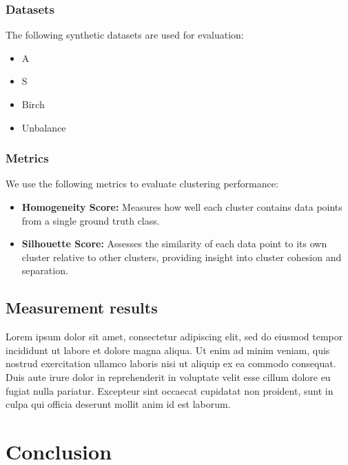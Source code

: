 \documentclass[10pt,twocolumn,letterpaper]{article}
\begin{document}
\subsubsection{Datasets}

The following synthetic datasets are used for evaluation:
\begin{itemize}
    \item A
    \item S
    \item Birch
    \item Unbalance
\end{itemize}

\subsubsection{Metrics}

We use the following metrics to evaluate clustering performance:
\begin{itemize}
    \item \textbf{Homogeneity Score:} Measures how well each cluster contains data points from a single ground truth class.
    \item \textbf{Silhouette Score:} Assesses the similarity of each data point to its own cluster relative to other clusters, providing insight into cluster cohesion and separation.
\end{itemize}


\subsection{Measurement results}\label{subsec:measurement-results}

Lorem ipsum dolor sit amet, consectetur adipiscing elit, sed do eiusmod tempor
incididunt ut labore et dolore magna aliqua. Ut enim ad minim veniam, quis
nostrud exercitation ullamco laboris nisi ut aliquip ex ea commodo consequat.
Duis aute irure dolor in reprehenderit in voluptate velit esse cillum dolore eu
fugiat nulla pariatur. Excepteur sint occaecat cupidatat non proident, sunt in
culpa qui officia deserunt mollit anim id est laborum.


\section{Conclusion}\label{sec:conclusion}
\end{document}

